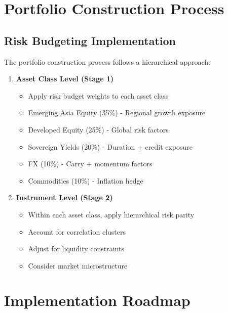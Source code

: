 \documentclass{article}
\begin{document}
\section{Portfolio Construction Process}

\subsection{Risk Budgeting Implementation}
The portfolio construction process follows a hierarchical approach:
\begin{enumerate}
    \item \textbf{Asset Class Level (Stage 1)}
    \begin{itemize}
        \item Apply risk budget weights to each asset class
        \item Emerging Asia Equity (35\%) - Regional growth exposure
        \item Developed Equity (25\%) - Global risk factors
        \item Sovereign Yields (20\%) - Duration + credit exposure
        \item FX (10\%) - Carry + momentum factors
        \item Commodities (10\%) - Inflation hedge
    \end{itemize}
    
    \item \textbf{Instrument Level (Stage 2)}
    \begin{itemize}
        \item Within each asset class, apply hierarchical risk parity
        \item Account for correlation clusters
        \item Adjust for liquidity constraints
        \item Consider market microstructure
    \end{itemize}
\end{enumerate}

\section{Implementation Roadmap}
\end{document}
